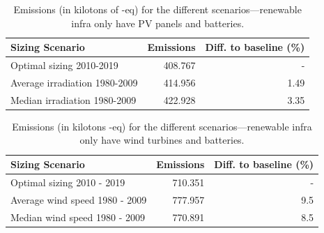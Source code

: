  \begin{table}[H]   
  \caption{Emissions (in kilotons of -eq) for the different scenarios---renewable infra only have PV panels and batteries.} \centering

   \label{tab:co2_10y_pv_only}
  
      \begin{tabular}{|l|r|r|}        
        \hline
        \textbf{Sizing Scenario} &  \textbf{Emissions } & \textbf{Diff. to baseline (\%) } \\
       \hline        
        Optimal sizing 2010-2019       &       408.767 &  -       \\
        \hline     
        Average irradiation 1980-2009  &       414.956 &  1.49    \\
        \hline
        Median irradiation  1980-2009  &       422.928 &  3.35   \\
        \hline        
      \end{tabular}
      
    \end{table}


    
 \begin{table}[H]   
  \caption{Emissions (in kilotons -eq) for the different scenarios---renewable infra only have wind turbines and batteries.} \centering

   \label{tab:co2_10y_wt_only}
  
      \begin{tabular}{|l|r|r|}        
        \hline
        \textbf{Sizing Scenario} &  \textbf{Emissions } & \textbf{Diff. to baseline (\%) } \\
        
        \hline
        Optimal sizing 2010 - 2019       &       710.351 &  -        \\
        \hline     
        Average wind speed 1980 - 2009  &       777.957 &  9.5      \\
        \hline 
        Median wind speed  1980 - 2009  &       770.891 &  8.5      \\
        \hline        
      \end{tabular}      
    \end{table}

